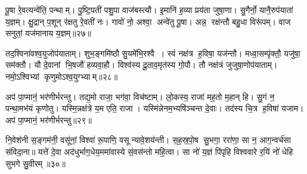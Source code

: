 पू॒षा रे॒वत्यन्वे॑ति॒ पन्थाम्। पु॒ष्टि॒पती॑ पशु॒पा वाज॑बस्त्यौ। इ॒मानि॑ ह॒व्या प्रय॑ता जुषा॒णा। सु॒गैर्नो॒ यानै॒रुप॑यातां य॒ज्ञम्। क्षु॒द्रान् प॒शून् र॑क्षतु रे॒वती॑ नः। गावो॑ नो॒ अश्वा॒ अन्वे॑तु पू॒षा। अन्न॒ रक्ष॑न्तौ बहु॒धा विरू॑पम्। वाज सनुतां॒ यज॑मानाय य॒ज्ञम्॥२७॥ 

तद॒श्विना॑वश्व॒युजोप॑याताम्। शुभ॒ङ्गमि॑ष्ठौ सु॒यमे॑भि॒रश्वै। स्वं नक्ष॑त्र ह॒विषा॒ यज॑न्तौ। मध्वा॒सम्पृ॑क्तौ॒ यजु॑षा॒ सम॑क्तौ। यौ दे॒वानां भि॒षजौ॑ हव्यवा॒हौ। विश्व॑स्य दू॒ताव॒मृत॑स्य गो॒पौ। तौ नक्ष॑त्रं जुजुषा॒णोप॑याताम्। नमो॒ऽश्विभ्यां कृणुमोऽश्व॒युग्भ्याम्॥२८॥ 

अप॑ पा॒प्मानं॒ भर॑णीर्भरन्तु। तद्य॒मो राजा॒ भग॑वा॒\an{} विच॑ष्टाम्। लो॒कस्य॒ राजा॑ मह॒तो म॒हान् हि। सु॒गं न॒ पन्था॒मभ॑यं कृणोतु। यस्मि॒न्नक्ष॑त्रे य॒म एति॒ राजा। यस्मि॑न्नेनम॒भ्यषि॑ञ्चन्त दे॒वाः। तद॑स्य चि॒त्र ह॒विषा॑ यजाम। अप॑ पा॒प्मानं॒ भर॑णीर्भरन्तु॥२९॥ 

नि॒वेश॑नी स॒ङ्गम॑नी॒ वसू॑नां॒ विश्वा॑ रू॒पाणि॒ वसून्यावे॒शय॑न्ती। स॒ह॒स्र॒पो॒ष सु॒भगा॒ ररा॑णा॒ सा न॒ आग॒न्वर्च॑सा संविदा॒ना॥ यत्ते॑ दे॒वा अद॑धुर्भाग॒धेय॒ममा॑वास्ये सं॒वस॑न्तो महि॒त्वा। सा नो॑ य॒ज्ञं पि॑पृहि विश्ववारे र॒यिं नो॑ धेहि सुभगे सु॒वीरम्॥३०॥ 